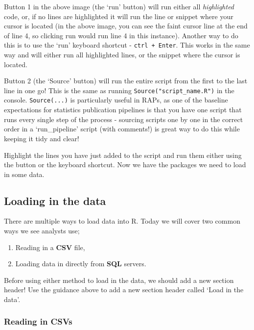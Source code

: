 \documentclass[
  12pt,
]{article}
\begin{document}
Button 1 in the above image (the `run' button) will run either all
\emph{highlighted} code, or, if no lines are highlighted it will run the
line or snippet where your cursor is located (in the above image, you
can see the faint cursor line at the end of line 4, so clicking run
would run line 4 in this instance). Another way to do this is to use the
`run' keyboard shortcut - \texttt{ctrl\ +\ Enter}. This works in the
same way and will either run all highlighted lines, or the snippet where
the cursor is located.

Button 2 (the `Source' button) will run the entire script from the first
to the last line in one go! This is the same as running
\texttt{Source("script\_name.R")} in the console. \texttt{Source(...)}
is particularly useful in RAPs, as one of the baseline expectations for
statistics publication pipelines is that you have one script that runs
every single step of the process - sourcing scripts one by one in the
correct order in a `run\_pipeline' script (with comments!) is great way
to do this while keeping it tidy and clear!

Highlight the lines you have just added to the script and run them
either using the button or the keyboard shortcut. Now we have the
packages we need to load in some data.

\hypertarget{loading-in-the-data}{%
\subsection{Loading in the data}\label{loading-in-the-data}}

There are multiple ways to load data into R. Today we will cover two
common ways we see analysts use;

\begin{enumerate}
\def\labelenumi{\arabic{enumi}.}
\item
  Reading in a \textbf{CSV} file,
\item
  Loading data in directly from \textbf{SQL} servers.
\end{enumerate}

Before using either method to load in the data, we should add a new
section header! Use the guidance above to add a new section header
called `Load in the data'.

\hypertarget{reading-in-csvs}{%
\subsubsection{Reading in CSVs}\label{reading-in-csvs}}
\end{document}
